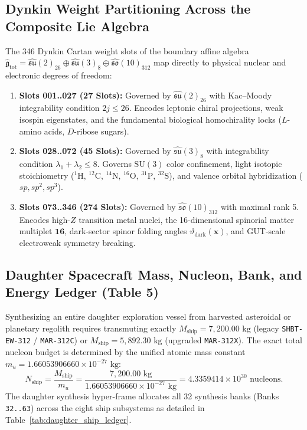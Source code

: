 \documentclass[11pt,onecolumn]{article}
\begin{document}
\subsection{Dynkin Weight Partitioning Across the Composite Lie Algebra}
The 346 Dynkin Cartan weight slots of the boundary affine algebra $\hat{\mathfrak{g}}_{\text{tot}} = \hat{\mathfrak{su}}(2)_{26} \oplus \hat{\mathfrak{su}}(3)_8 \oplus \hat{\mathfrak{so}}(10)_{312}$ map directly to physical nuclear and electronic degrees of freedom:
\begin{enumerate}
    \item \textbf{Slots 001..027 (27 Slots):} Governed by $\hat{\mathfrak{su}}(2)_{26}$ with Kac--Moody integrability condition $2j \le 26$. Encodes leptonic chiral projections, weak isospin eigenstates, and the fundamental biological homochirality locks ($L$-amino acids, $D$-ribose sugars).
    \item \textbf{Slots 028..072 (45 Slots):} Governed by $\hat{\mathfrak{su}}(3)_8$ with integrability condition $\lambda_1 + \lambda_2 \le 8$. Governs $\text{SU}(3)$ color confinement, light isotopic stoichiometry ($^{1}\text{H}, \,^{12}\text{C}, \,^{14}\text{N}, \,^{16}\text{O}, \,^{31}\text{P}, \,^{32}\text{S}$), and valence orbital hybridization ($sp, sp^2, sp^3$).
    \item \textbf{Slots 073..346 (274 Slots):} Governed by $\hat{\mathfrak{so}}(10)_{312}$ with maximal rank 5. Encodes high-$Z$ transition metal nuclei, the 16-dimensional spinorial matter multiplet $\mathbf{16}$, dark-sector spinor folding angles $\vartheta_{\text{dark}}(\mathbf{x})$, and GUT-scale electroweak symmetry breaking.
\end{enumerate}

\FloatBarrier
\subsection{Daughter Spacecraft Mass, Nucleon, Bank, and Energy Ledger (Table 5)}
Synthesizing an entire daughter exploration vessel from harvested asteroidal or planetary regolith requires transmuting exactly $M_{\text{ship}} = 7{,}200.00\text{ kg}$ (legacy \texttt{SHBT-EW-312} / \texttt{MAR-312C}) or $M_{\text{ship}} = 5{,}892.30\text{ kg}$ (upgraded \texttt{MAR-312X}). The exact total nucleon budget is determined by the unified atomic mass constant $m_u = 1.66053906660 \times 10^{-27}\text{ kg}$:
\begin{equation}
N_{\text{ship}} = \frac{M_{\text{ship}}}{m_u} = \frac{7{,}200.00\text{ kg}}{1.66053906660 \times 10^{-27}\text{ kg}} = 4.3359414 \times 10^{30}\text{ nucleons}.
\label{eq:daughter_ship_nucleons}
\end{equation}
The daughter synthesis hyper-frame allocates all 32 synthesis banks (Banks \texttt{32..63}) across the eight ship subsystems as detailed in Table~\ref{tab:daughter_ship_ledger}.
\end{document}
